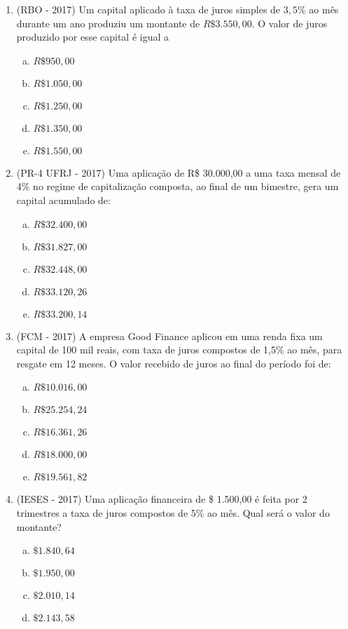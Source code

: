 \begin{enumerate}
  \item (RBO - 2017) Um capital aplicado à taxa de juros simples de $3,5\%$ ao mês durante um ano produziu um montante de $R\$ 3.550,00$. O valor de juros produzido por esse capital é igual a
  \begin{enumerate}[a)]
  \item $R\$ 950,00$
  \item $R\$ 1.050,00$
  \item $R\$ 1.250,00$
  \item $R\$ 1.350,00$
  \item $R\$ 1.550,00$
  \end{enumerate}
  
  \item (PR-4 UFRJ - 2017) Uma aplicação de R\$ 30.000,00 a uma taxa mensal de 4\% no regime de capitalização composta, ao final de um bimestre, gera um capital acumulado de:
  \begin{enumerate}[a)]
  \item $R\$ 32.400,00$
  \item $R\$ 31.827,00$
  \item $R\$ 32.448,00$
  \item $R\$ 33.120,26$
  \item $R\$ 33.200,14$
  \end{enumerate}
  
  \item (FCM - 2017) A empresa Good Finance aplicou em uma renda fixa um capital de 100 mil reais, com taxa de juros compostos de 1,5\% ao mês, para resgate em 12 meses. O valor recebido de juros ao final do período foi de:
  \begin{enumerate}[a)]
  \item $R\$ 10.016,00$
  \item $R\$ 25.254,24$
  \item $R\$ 16.361,26$
  \item $R\$ 18.000,00$
  \item $R\$ 19.561,82$
  \end{enumerate}
  
  \item (IESES - 2017) Uma aplicação financeira de \$ 1.500,00 é feita por 2 trimestres a taxa de juros compostos de 5\% ao mês. Qual será o valor do montante?
  \begin{enumerate}[a)]
  \item $\$ 1.840,64$
  \item $\$ 1.950,00$
  \item $\$ 2.010,14$
  \item $\$ 2.143,58$
  \end{enumerate}
  

\end{enumerate}
